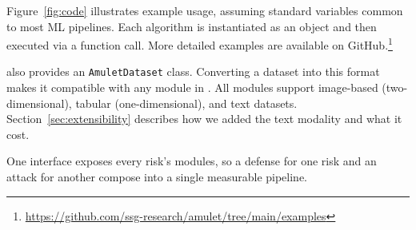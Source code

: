 Figure~\ref{fig:code} illustrates example usage, assuming standard variables common to most ML pipelines.
Each algorithm is instantiated as an object and then executed via a function call.
More detailed examples are available on GitHub.\footnote{\url{https://github.com/ssg-research/amulet/tree/main/examples}}

\method also provides an \texttt{AmuletDataset} class.
Converting a dataset into this format makes it compatible with any module in \method.
All modules support image-based (two-dimensional), tabular (one-dimensional), and text datasets.
Section~\ref{sec:extensibility} describes how we added the text modality and what it cost.

\begin{takeaway}
One interface exposes every risk's modules, so a defense for one risk and an attack for another compose into a single measurable pipeline.
\end{takeaway}
